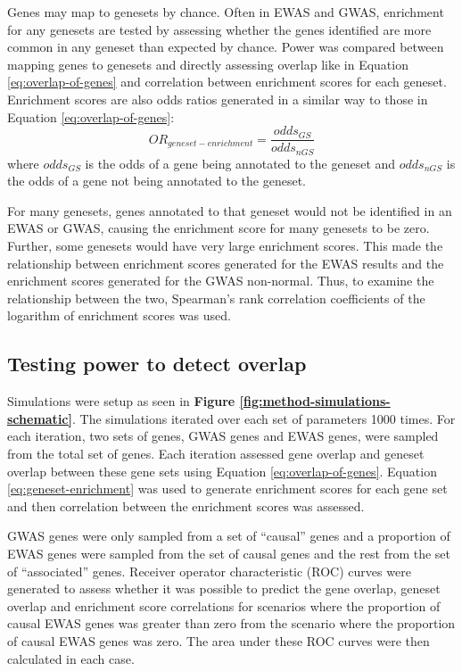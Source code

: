 \documentclass[11pt,twoside]{bristolthesis}
\begin{document}
Genes may map to genesets by chance. Often in EWAS and GWAS, enrichment for any genesets are tested by assessing whether the genes identified are more common in any geneset than expected by chance. Power was compared between mapping genes to genesets and directly assessing overlap like in Equation \eqref{eq:overlap-of-genes} and correlation between enrichment scores for each geneset. Enrichment scores are also odds ratios generated in a similar way to those in Equation \eqref{eq:overlap-of-genes}:
\begin{equation}
    OR_{geneset-enrichment} = \frac{odds_{GS}} {odds_{nGS}}
    \label{eq:geneset-enrichment}
\end{equation}
where \(odds_{GS}\) is the odds of a gene being annotated to the geneset and \(odds_{nGS}\) is the odds of a gene not being annotated to the geneset.

For many genesets, genes annotated to that geneset would not be identified in an EWAS or GWAS, causing the enrichment score for many genesets to be zero. Further, some genesets would have very large enrichment scores. This made the relationship between enrichment scores generated for the EWAS results and the enrichment scores generated for the GWAS non-normal. Thus, to examine the relationship between the two, Spearman's rank correlation coefficients of the logarithm of enrichment scores was used.

\hypertarget{testing-power-to-detect-overlap}{%
\subsection{Testing power to detect overlap}\label{testing-power-to-detect-overlap}}

Simulations were setup as seen in \textbf{Figure \ref{fig:method-simulations-schematic}}. The simulations iterated over each set of parameters 1000 times. For each iteration, two sets of genes, GWAS genes and EWAS genes, were sampled from the total set of genes. Each iteration assessed gene overlap and geneset overlap between these gene sets using Equation \eqref{eq:overlap-of-genes}. Equation \eqref{eq:geneset-enrichment} was used to generate enrichment scores for each gene set and then correlation between the enrichment scores was assessed.

GWAS genes were only sampled from a set of ``causal'' genes and a proportion of EWAS genes were sampled from the set of causal genes and the rest from the set of ``associated'' genes. Receiver operator characteristic (ROC) curves were generated to assess whether it was possible to predict the gene overlap, geneset overlap and enrichment score correlations for scenarios where the proportion of causal EWAS genes was greater than zero from the scenario where the proportion of causal EWAS genes was zero. The area under these ROC curves were then calculated in each case.
\end{document}
